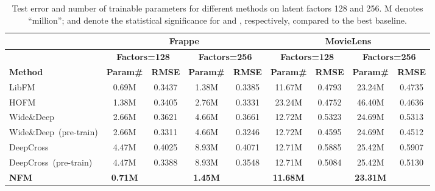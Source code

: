 \begin{table*}[t]
	\small
	\begin{center}
		\caption{Test error and number of trainable parameters for different methods on latent factors 128 and 256. M denotes ``million'';  and  denote the statistical significance for  and , respectively, compared to the best baseline. }
		\vspace{-10pt}
		\label{tab:performance}
		\begin{tabular}{| l | c | c | c | c | c | c | c | c |} \hline
			& \multicolumn{4}{c|}{\textbf{Frappe}} & \multicolumn{4}{c|}{\textbf{MovieLens}} \\ \hline 
			& \multicolumn{2}{c|}{\textbf{Factors=128}} & \multicolumn{2}{c|}{\textbf{Factors=256}} & \multicolumn{2}{c|}{\textbf{Factors=128}} & \multicolumn{2}{c|}{\textbf{Factors=256}}\\ \hline 
			\textbf{Method} & \textbf{Param\#} & \textbf{RMSE} & \textbf{Param\#} & \textbf{RMSE} & \textbf{Param\#} & \textbf{RMSE} & \textbf{Param\#} & \textbf{RMSE} \\ \hline\hline
			LibFM~\cite{libFM} 	& 0.69M  & 0.3437 & 1.38M  & 0.3385 & 11.67M  & 0.4793 & 23.24M  & 0.4735 \\ \hline
			HOFM & 1.38M  & 0.3405 & 2.76M & 0.3331 & 23.24M & 0.4752
			& 46.40M & 0.4636 \\ \hline\hline
			Wide\&Deep~\cite{WideDeep} &  2.66M  & 0.3621 & 4.66M & 0.3661 & 12.72M & 0.5323 & 24.69M  & 0.5313 \\ \hline
			Wide\&Deep~(pre-train) &  2.66M  & 0.3311 & 4.66M & 0.3246  & 12.72M & 0.4595 & 24.69M  & 0.4512 \\ \hline \hline
			DeepCross~\cite{DeepCross}	& 4.47M  & 0.4025 & 8.93M & 0.4071  & 12.71M & 0.5885 & 25.42M  & 0.5907 \\ \hline
			DeepCross~(pre-train)	& 4.47M  & 0.3388 & 8.93M & 0.3548  & 12.71M & 0.5084 & 25.42M  & 0.5130  \\ \hline \hline
			\textbf{NFM} & \textbf{0.71M} &  & \textbf{1.45M}  &  & \textbf{11.68M} &  & \textbf{23.31M}  & \\ \hline
		\end{tabular}
	\end{center}
	\vspace{-8pt}
\end{table*}

